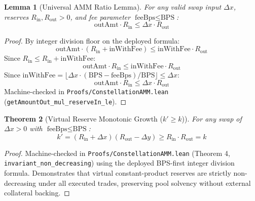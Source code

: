 \documentclass[11pt,a4paper]{article}
\theoremstyle{plain}
\newtheorem{theorem}{Theorem}[section]
\newtheorem{lemma}[theorem]{Lemma}
\theoremstyle{definition}
\theoremstyle{remark}
\begin{document}
\begin{lemma}[Universal AMM Ratio Lemma]
\label{lem:amm_ratio}
For any valid swap input $\Delta x$, reserves $R_{\text{in}}, R_{\text{out}} > 0$, and fee parameter $\text{feeBps} \le \text{BPS}$:
\begin{equation}
    \text{outAmt} \cdot R_{\text{in}} \le \Delta x \cdot R_{\text{out}}
\end{equation}
\end{lemma}
\begin{proof}
By integer division floor on the deployed formula:
$$\text{outAmt} \cdot (R_{\text{in}} + \text{inWithFee}) \le \text{inWithFee} \cdot R_{\text{out}}$$
Since $R_{\text{in}} \le R_{\text{in}} + \text{inWithFee}$:
$$\text{outAmt} \cdot R_{\text{in}} \le \text{inWithFee} \cdot R_{\text{out}}$$
Since $\text{inWithFee} = \lfloor \Delta x \cdot (\text{BPS} - \text{feeBps}) / \text{BPS} \rfloor \le \Delta x$:
$$\text{outAmt} \cdot R_{\text{in}} \le \Delta x \cdot R_{\text{out}}$$
Machine-checked in \texttt{Proofs/ConstellationAMM.lean} (\texttt{getAmountOut\_mul\_reserveIn\_le}).
\end{proof}

\begin{theorem}[Virtual Reserve Monotonic Growth ($k' \ge k$)]
\label{thm:amm_k_growth}
For any swap of $\Delta x > 0$ with $\text{feeBps} \le \text{BPS}$:
\begin{equation}
    k' = (R_{\text{in}} + \Delta x)(R_{\text{out}} - \Delta y) \ge R_{\text{in}} \cdot R_{\text{out}} = k
\end{equation}
\end{theorem}
\begin{proof}
Machine-checked in \texttt{Proofs/ConstellationAMM.lean} (Theorem 4, \texttt{invariant\_non\_decreasing}) using the deployed BPS-first integer division formula. Demonstrates that virtual constant-product reserves are strictly non-decreasing under all executed trades, preserving pool solvency without external collateral backing.
\end{proof}
\end{document}
